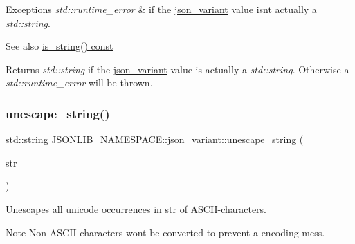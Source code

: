\begin{DoxyExceptions}{Exceptions}
{\em std\+::runtime\+\_\+error} & if the \hyperlink{classJSONLIB__NAMESPACE_1_1json__variant}{json\+\_\+variant} value isn\textquotesingle{}t actually a {\itshape std\+::string}. \\
\hline
\end{DoxyExceptions}
\begin{DoxySeeAlso}{See also}
\hyperlink{classJSONLIB__NAMESPACE_1_1json__variant_ae097a22fe419dd083ff07bfebf0e8151}{is\+\_\+string() const} 
\end{DoxySeeAlso}
\begin{DoxyReturn}{Returns}
{\itshape std\+::string} if the \hyperlink{classJSONLIB__NAMESPACE_1_1json__variant}{json\+\_\+variant} value is actually a {\itshape std\+::string}. Otherwise a {\itshape std\+::runtime\+\_\+error} will be thrown. 
\end{DoxyReturn}
\mbox{\label{classJSONLIB__NAMESPACE_1_1json__variant_ab3b411443074a97949b5675676d0b136}} 
\subsubsection{\texorpdfstring{unescape\+\_\+string()}{unescape\_string()}\hspace{0.1cm}{\footnotesize\ttfamily [1/2]}}
{\footnotesize\ttfamily std\+::string J\+S\+O\+N\+L\+I\+B\+\_\+\+N\+A\+M\+E\+S\+P\+A\+C\+E\+::json\+\_\+variant\+::unescape\+\_\+string (\begin{DoxyParamCaption}\item[{std\+::string}]{str }\end{DoxyParamCaption})\hspace{0.3cm}{\ttfamily [static]}}



Unescapes all unicode occurrences in {\ttfamily str} of A\+S\+C\+I\+I-\/characters. 

\begin{DoxyNote}{Note}
Non-\/\+A\+S\+C\+II characters won\textquotesingle{}t be converted to prevent a encoding mess. 
\end{DoxyNote}

